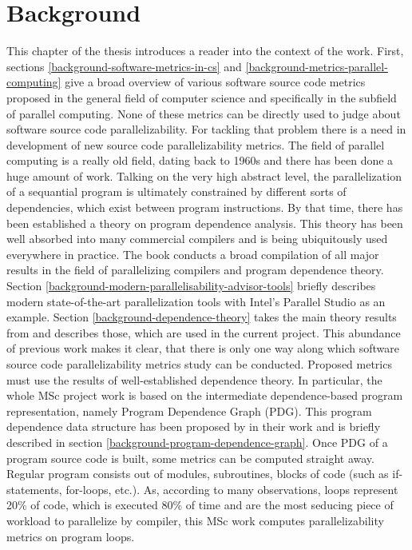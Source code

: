 \chapter{Background} \label{backgroud}
\qquad This chapter of the thesis introduces a reader into the context of the work. First, sections \ref{background-software-metrics-in-cs} and \ref{background-metrics-parallel-computing} give a broad overview of various software source code metrics proposed in the general field of computer science and specifically in the subfield of parallel computing. None of these metrics can be directly used to judge about software source code parallelizability. For tackling that problem there is a need in development of new source code parallelizability metrics.\newline
\null\qquad The field of parallel computing is a really old field, dating back to 1960s and there has been done a huge amount of work. Talking on the very high abstract level, the parallelization of a sequantial program is ultimately constrained by different sorts of dependencies, which exist between program instructions. By that time, there has been established a theory on program dependence analysis. This theory has been well absorbed into many commercial compilers and is being ubiquitously used everywhere in practice. The book \cite{optimizing-compilers-book} conducts a broad compilation of all major results in the field of parallelizing compilers and program dependence theory. Section \ref{background-modern-parallelisability-advisor-tools} briefly describes modern state-of-the-art parallelization tools with Intel's Parallel Studio \cite{intel-parallel-studio} as an example. Section \ref{background-dependence-theory} takes the main theory results from \cite{optimizing-compilers-book} and describes those, which are used in the current project.\newline
\null\qquad This abundance of previous work makes it clear, that there is only one way along which software source code parallelizability metrics study can be conducted. Proposed metrics must use the results of well-established dependence theory. In particular, the whole MSc project work is based on the intermediate dependence-based program representation, namely Program Dependence Graph (PDG). This program dependence data structure has been proposed by in their work \cite{pdg-paper} and is briefly described in section \ref{background-program-dependence-graph}.\newline
\null\qquad Once PDG of a program source code is built, some metrics can be computed straight away. Regular program consists out of modules, subroutines, blocks of code (such as if-statements, for-loops, etc.). As, according to many observations, loops represent 20\% of code, which is executed 80\% of time and are the most seducing piece of workload to parallelize by compiler, this MSc work computes parallelizability metrics on program loops.\newline
